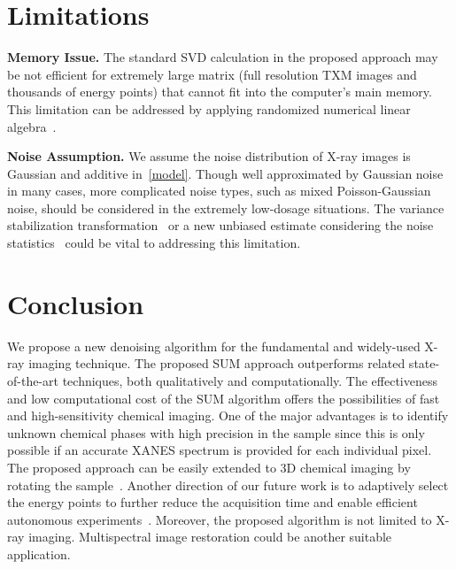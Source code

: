 \documentclass[10pt,twocolumn,letterpaper]{article}
\begin{document}
\vspace{-2pt}
\section{Limitations}
\vspace{-2pt}

\textbf{Memory Issue.} The standard SVD calculation in the proposed approach may be not efficient for extremely large matrix (\eg full resolution TXM images and thousands of energy points) that cannot fit into the computer's main memory. This limitation can be addressed by applying randomized numerical linear algebra~\cite{drineas2016randnla,martinsson2011randomized}.

\textbf{Noise Assumption.} We assume the noise distribution of X-ray images is Gaussian and additive in~\cref{model}. Though well approximated by Gaussian noise in many cases, more complicated noise types, such as mixed Poisson-Gaussian noise, should be considered in the extremely low-dosage situations. The variance stabilization transformation~\cite{makitalo2010optimal} or a new unbiased estimate considering the noise statistics~\cite{luisier2010image} could be vital to addressing this limitation.   

\vspace{-2pt}
\section{Conclusion}
\vspace{-2pt}
We propose a new denoising algorithm for the fundamental and widely-used X-ray imaging technique. The proposed SUM approach outperforms related state-of-the-art techniques, both qualitatively and computationally. The effectiveness and low computational cost of the SUM algorithm offers the possibilities of fast and high-sensitivity chemical imaging. One of the major advantages is to identify unknown chemical phases with high precision in the sample since this is only possible if an accurate XANES spectrum is provided for each individual pixel. The proposed approach can be easily extended to 3D chemical imaging by rotating the sample~\cite{kuppan2017phase}. Another direction of our future work is to adaptively select the energy points to further reduce the acquisition time and enable efficient autonomous experiments~\cite{noack2021gaussian}. Moreover, the proposed algorithm is not limited to X-ray imaging. Multispectral image restoration could be another suitable application. 

{\small


}
\end{document}
